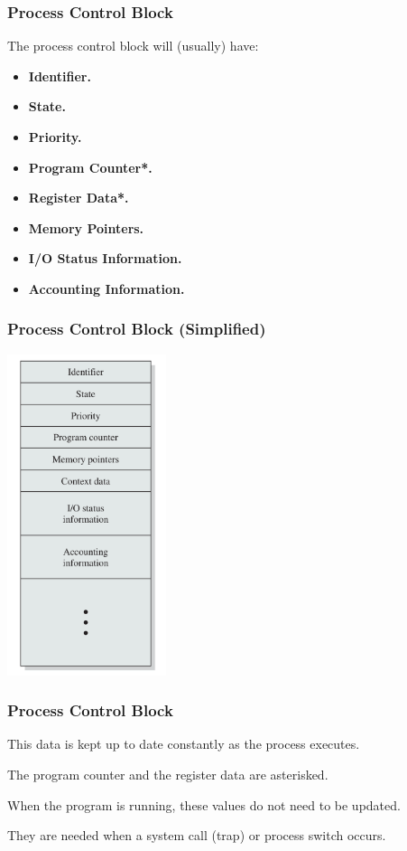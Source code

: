 \begin{frame}
	\frametitle{Process Control Block}

	The process control block will (usually) have:
	\begin{itemize}
		\item \textbf{Identifier.}
		\item \textbf{State.}
		\item \textbf{Priority.}
		\item \textbf{Program Counter*.}
		\item \textbf{Register Data*.}
		\item \textbf{Memory Pointers.}
		\item \textbf{I/O Status Information.}
		\item \textbf{Accounting Information.}
	\end{itemize}

\end{frame}

\begin{frame}
	\frametitle{Process Control Block (Simplified)}

	\begin{center}
		\includegraphics[width=0.35\textwidth]{images/pcb.png}
	\end{center}

\end{frame}

\begin{frame}
	\frametitle{Process Control Block}

	This data is kept up to date constantly as the process executes.

	The program counter and the register data are asterisked.

	When the program is running, these values do not need to be updated.

	They are needed when a system call (trap) or process switch occurs.

\end{frame}

